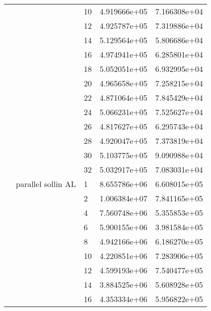 \begin{tabular}{lllrr}
                      &                     & 10 &  4.919666e+05 &  7.166308e+04 \\
                      &                     & 12 &  4.925787e+05 &  7.319886e+04 \\
                      &                     & 14 &  5.129564e+05 &  5.806686e+04 \\
                      &                     & 16 &  4.974941e+05 &  6.285801e+04 \\
                      &                     & 18 &  5.052051e+05 &  6.932995e+04 \\
                      &                     & 20 &  4.965658e+05 &  7.258215e+04 \\
                      &                     & 22 &  4.871064e+05 &  7.845429e+04 \\
                      &                     & 24 &  5.066231e+05 &  7.525627e+04 \\
                      &                     & 26 &  4.817627e+05 &  6.295743e+04 \\
                      &                     & 28 &  4.920047e+05 &  7.373819e+04 \\
                      &                     & 30 &  5.103775e+05 &  9.090988e+04 \\
                      &                     & 32 &  5.032917e+05 &  7.083031e+04 \\
                      & parallel sollin AL & 1  &  8.655786e+06 &  6.608015e+05 \\
                      &                     & 2  &  1.006384e+07 &  7.841165e+05 \\
                      &                     & 4  &  7.560748e+06 &  5.355853e+05 \\
                      &                     & 6  &  5.900155e+06 &  3.981584e+05 \\
                      &                     & 8  &  4.942166e+06 &  6.186270e+05 \\
                      &                     & 10 &  4.220851e+06 &  7.283906e+05 \\
                      &                     & 12 &  4.599193e+06 &  7.540477e+05 \\
                      &                     & 14 &  3.884525e+06 &  5.608928e+05 \\
                      &                     & 16 &  4.353334e+06 &  5.956822e+05 \\

\end{tabular}
